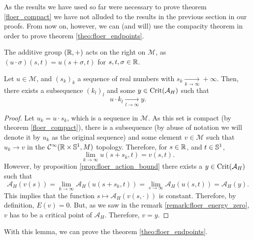As the results we have used so far were necessary to prove theorem \ref{floer_compact} we have not alluded to the results in the previous section in our proofs. From now on, however, we can (and will) use the compacity theorem in order to prove theorem \ref{theo:floer_endpoints}.

\begin{rmrk} \label{floer_group_action}
The additive group $(\mathbb{R},+)$ acts on the right on $\mathcal{M}$, as $(u \cdot \sigma)(s,t) = u(s+\sigma,t)$ for $s,t,\sigma \in \mathbb{R}$.
\end{rmrk}

\begin{lema} \label{lema:floer_sequence_limit}
Let $u \in \mathcal{M}$, and $(s_k)_k$ a sequence of real numbers with $s_k \xrightarrow[k \rightarrow \infty]{} +\infty$. Then, there exists a subsequence $(k_l)_l$ and some $y \in \mathrm{Crit}(\mathcal{A}_H)$ such that
\[u \cdot k_l \xrightarrow[l\rightarrow \infty]{} y .\]
\end{lema}

\begin{proof}
Let $u_k = u \cdot s_k$, which is a sequence in $\mathcal{M}$. As this set is compact (by theorem \ref{floer_compact}), there is a subsequence (by abuse of notation we will denote it by $u_k$ as the original sequence) and some element $v \in \mathcal{M}$ such that $u_k \rightarrow v$ in the $\mathcal{C}^{\infty}(\mathbb{R} \times \mathbb{S}^1, M)$ topology. Therefore, for $s \in \mathbb{R}$, and $t \in \mathbb{S}^1$,
\[\lim_{k\rightarrow \infty} u(s+s_k,t) = v(s,t) .\]
However, by proposition \ref{prop:floer_action_bound} there exists a $y \in \mathrm{Crit}(\mathcal{A}_H)$ such that
\[\mathcal{A}_H(v(s)) = \lim_{k\rightarrow\infty} \mathcal{A}_H(u(s+s_k,t)) = \lim_{s\rightarrow \infty} \mathcal{A}_H(u(s,t)) = \mathcal{A}_H(y) .\]
This implies that the function $s \mapsto \mathcal{A}_H(v(s,\cdot))$ is constant. Therefore, by definition, $E(v) = 0$. But, as we saw in the remark \ref{remark:floer_energy_zero}, $v$ has to be a critical point of $\mathcal{A}_H$. Therefore, $v=y$.
\end{proof}

With this lemma, we can prove the theorem \ref{theo:floer_endpoints}.

